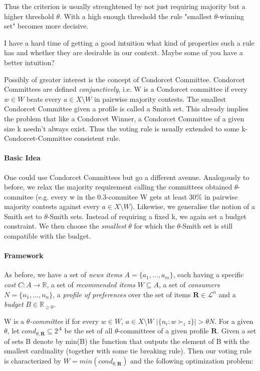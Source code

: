 \documentclass[10pt,a4paper]{article}
\begin{document}
Thus the criterion is usually strenghtened by not just requiring majority but a higher threshold $\theta$. With a high enough threshold the rule
"smallest $\theta$-winning set" becomes more decisive.

I have a hard time of getting a good intuition what kind of properties such a rule has and whether they are desirable in our context. Maybe some
of you have a better intuition?

Possibly of greater interest is the concept of Condorcet Committee. Condorcet Committees are defined \emph{conjunctively}, i.e. W is a Condorcet
committee if every $w\in W$ beats every $a\in X\setminus W$ in pairwise majority contests. The smallest Condorcet Committee given a profile is
called a Smith set. This already implies the problem that like a Condorcet Winner, a Condorcet Committee of a given size k needn't always exist.
Thus the voting rule is usually extended to some k-Condorcet-Committee consistent rule.

\paragraph{Basic Idea}

One could use Condorcet Committees but go a different avenue. Analogously to before, we relax the majority requirement calling the committees
obtained $\theta$-commitee (e.g. every w in the $0.3$-commitee W gets at least 30\% in pairwise majority contests against every $a\in X\setminus
W$). Likewise, we generalise the notion of a Smith set to $\theta$-Smith sets. Instead of requiring a fixed k, we again set a budget constraint.
We then choose the \emph{smallest} $\theta$ for which the $\theta$-Smith set is still compatible with the budget.

\paragraph{Framework}

As before, we have a set of \emph{news items} $A=\{a_1,...,a_m\}$, each having a specific \emph{cost} $C: A\rightarrow \mathbb{R}$, a set of
\emph{recommended items} $W\subseteq A$, a set of \emph{consumers} $N=\{n_1,...,n_n\}$, a \emph{profile of preferences} over the set of items
$\mathbf{R}\in \mathcal{L}^n$ and a \emph{budget} $B\in \mathbb{R}_{\geq 0}$.

W is a \emph{$\theta$-committee} if for every $w\in W$, $a\in X\setminus W$ $|\{n_i:w\succ_i z\}|>\theta N$. For a given $\theta$, let
$cond_{\theta,\mathbf{R}}\subseteq 2^A$ be the set of all $\theta$-committees of a given profile $\mathbf{R}$. Given a set of sets B denote by min(B) the function that outputs the element of B with the smallest cardinality (together with some tie breaking rule). Then our voting rule is characterized by $W=min(cond_{\theta,\mathbf{R}})$ and the following optimization problem:
\end{document}
